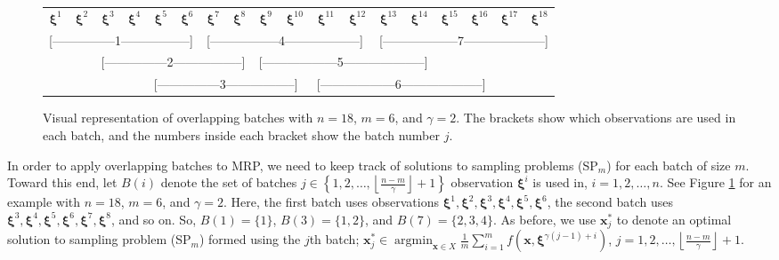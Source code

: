 \documentclass[12pt]{article}
\newcommand{\x}{\mathbf{x}}
\newcommand{\xs}{\x^*}
\newcommand{\xit}{\boldsymbol{\xi}}
\newcommand{\xiti}{\xit^i}
\newcommand{\nb}{\left\lfloor\tfrac{n-m}{\gamma}\right\rfloor+1}
\DeclareMathOperator*{\argmin}{argmin}
\begin{document}
\begin{figure}[tb!]
	\centering
	\begin{tabular}{*{18}{c}}
		$\xit^1$ & $\xit^2$ & $\xit^3$ & $\xit^4$ & $\xit^5$ & $\xit^6$ & $\xit^7$ & $\xit^8$ & $\xit^9$ & $\xit^{10}$ & $\xit^{11}$ & $\xit^{12}$ & $\xit^{13}$ & $\xit^{14}$ & $\xit^{15}$ & $\xit^{16}$ & $\xit^{17}$  & $\xit^{18}$ \\
		\multicolumn{6}{l}{[---------------1-----------------]} &
		\multicolumn{6}{l}{[-----------------4------------------]} &
		\multicolumn{6}{l}{[------------------7--------------------]} \\
		& & \multicolumn{6}{l}{[---------------2-----------------]} &
		\multicolumn{6}{l}{[------------------5--------------------]} \\
		& & & & \multicolumn{6}{l}{[---------------3-----------------]} &
		\multicolumn{6}{l}{[------------------6--------------------]} \\
	\end{tabular}
	\caption{Visual representation of overlapping batches with $n = 18$, $m = 6$, and $\gamma = 2$.  
        The brackets show which observations are used in each batch, and the numbers inside each bracket show the batch number $j$.}
	\label{fig:overlap_nonint}
\end{figure}

In order to apply overlapping batches to MRP, we need to keep track of solutions to sampling problems (SP$_m$) for each batch of size $m$.  
Toward this end, let $B(i)$ denote the set of batches $j \in \left\{1, 2, \dots, \nb \right\}$ observation $\xiti$ is used in, $i = 1, 2, \dots, n$.  
See Figure \ref{fig:overlap_nonint} for an example with $n=18$, $m = 6$, and $\gamma = 2$.  
Here, the first batch uses observations $\xit^1, \xit^2, \xit^3, \xit^4, \xit^5, \xit^6$, the second batch uses $\xit^3, \xit^4, \xit^5, \xit^6, \xit^7, \xit^8$, and so on.  
So, $B(1) = \{1\}$, $B(3) = \{1,2\}$, and $B(7)=\{2,3,4\}$.  
As before, we use $\xs_j$ to denote an optimal solution to sampling problem (SP$_m$) formed using the $j$th batch; $\xs_j \in \argmin_{\x \in X} \frac{1}{m} \sum_{i=1}^m f(\x,\xit^{\gamma(j-1) + i})$, $j = 1, 2, \dots, \nb$.
\end{document}
